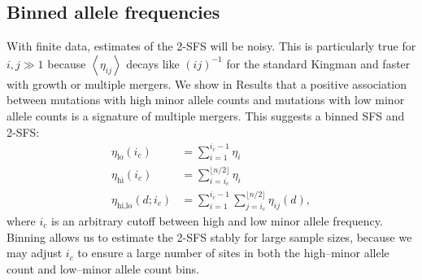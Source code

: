 \documentclass[11pt, letterpaper]{article}   	%
\newcommand{\Eq}[1]{Equation~(\ref{#1})}
\newcommand{\floor}[1]{\lfloor #1 \rfloor}
\newcommand{\E}[1]{\left< #1 \right>}
\DeclareMathOperator{\pmi}{pmi}
\begin{document}



\subsection*{Binned allele frequencies}

With finite data, estimates of the 2-SFS will be noisy.
This is particularly true for $i,j\gg1$ because $\E{\eta_{ij}}$ decays like $(ij)^{-1}$ for the standard Kingman \autocite{Fu1995} and faster with growth or multiple mergers.
We show in Results that a positive association between mutations with high minor allele counts and mutations with low minor allele counts is a signature of multiple mergers.
This suggests a binned SFS and 2-SFS:
\begin{align}
    \eta_{\text{lo}}(i_c) &= \sum_{i=1}^{i_c-1} \eta_i \\
    \eta_{\text{hi}}(i_c) &= \sum_{i=i_c}^{\floor{n/2}} \eta_i \\
    \eta_{\text{hi,lo}}(d; i_c) &= \sum_{i=1}^{i_c-1} \sum_{j=i_c}^{\floor{n/2}} \eta_{ij}(d),
\end{align}
where $i_c$ is an arbitrary cutoff between high and low minor allele frequency.
Binning allows us to estimate the 2-SFS stably for large sample sizes, because we may adjust $i_c$ to ensure a large number of sites in both the high--minor allele count and low--minor allele count bins.
\end{document}
